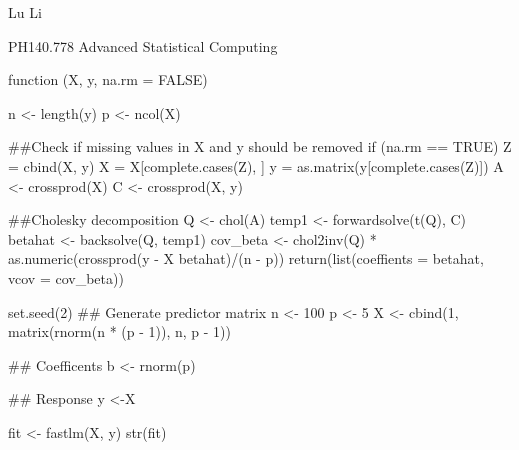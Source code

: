 \documentclass[a4paper]{book}
\begin{document}
%
\begin{Author}\relax

Lu Li
\end{Author}
%
\begin{References}\relax

PH140.778 Advanced Statistical Computing
\end{References}
%
\begin{Examples}
\begin{ExampleCode}

function (X, y, na.rm = FALSE) 
{
    n <- length(y)
    p <- ncol(X)
    
    ##Check if missing values in X and y should be removed
    if (na.rm == TRUE) {
        Z = cbind(X, y)
        X = X[complete.cases(Z), ]
        y = as.matrix(y[complete.cases(Z)])
    }
    A <- crossprod(X)
    C <- crossprod(X, y)
    
    ##Cholesky decomposition
    Q <- chol(A)
    temp1 <- forwardsolve(t(Q), C)
    betahat <- backsolve(Q, temp1)
    cov_beta <- chol2inv(Q) * as.numeric(crossprod(y - X %
        betahat)/(n - p))
    return(list(coeffients = betahat, vcov = cov_beta))
  }
    set.seed(2)
## Generate predictor matrix
    n <- 100
    p <- 5
    X <- cbind(1, matrix(rnorm(n * (p - 1)), n, p - 1))

## Coefficents
    b <- rnorm(p)

## Response
    y <-X%

    fit <- fastlm(X, y)
    str(fit)
\end{ExampleCode}
\end{Examples}
\printindex{}
\end{document}
